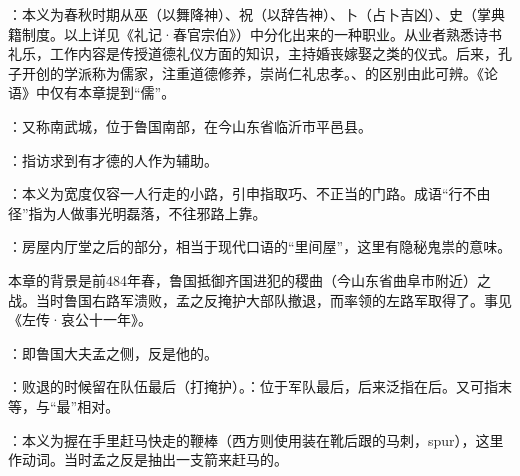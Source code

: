 {
\item {}：本义为春秋时期从巫（以舞降神）、祝（以辞告神）、卜（占卜吉凶）、史（掌典籍制度。以上详见《礼记·春官宗伯》）中分化出来的一种职业。从业者熟悉诗书礼乐，工作内容是传授道德礼仪方面的知识，主持婚丧嫁娶之类的仪式。后来，孔子开创的学派称为儒家，注重道德修养，崇尚仁礼忠孝。、的区别由此可辨。《论语》中仅有本章提到“儒”。
}
{}


{
\item {}：又称南武城，位于鲁国南部，在今山东省临沂市平邑县。
\item {}：指访求到有才德的人作为辅助。
\item {}：本义为宽度仅容一人行走的小路，引申指取巧、不正当的门路。成语“行不由径”指为人做事光明磊落，不往邪路上靠。
\item {}：房屋内厅堂之后的部分，相当于现代口语的“里间屋”，这里有隐秘鬼祟的意味。
}
{}  %


{本章的背景是前484年春，鲁国抵御齐国进犯的稷曲（今山东省曲阜市附近）之战。当时鲁国右路军溃败，孟之反掩护大部队撤退，而率领的左路军取得了。事见《左传·哀公十一年》。
\begin{lyblobitemize}
\item {}：即鲁国大夫孟之侧，反是他的。
\item {}：败退的时候留在队伍最后（打掩护）。：位于军队最后，后来泛指在后。又可指末等，与“最”相对。
\item {}：本义为握在手里赶马快走的鞭棒（西方则使用装在靴后跟的马刺，spur），这里作动词。当时孟之反是抽出一支箭来赶马的。
\end{lyblobitemize}
}
{}


